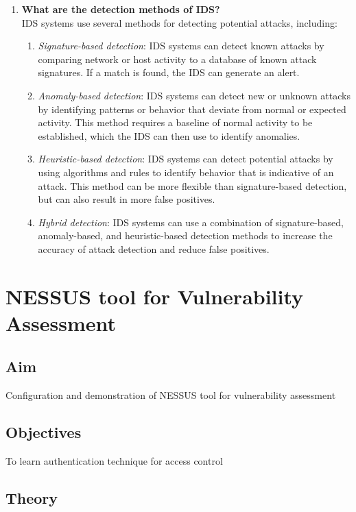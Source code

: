 \documentclass[openany]{book}
\begin{document}
\begin{enumerate}
    \item \textbf{What are the detection methods of IDS?}\\
          IDS systems use several methods for detecting potential attacks, including:
          \begin{enumerate}
              \item \textit{Signature-based detection}: IDS systems can detect known attacks by comparing network or host activity to a database of known attack signatures. If a match is found, the IDS can generate an alert.
              \item \textit{Anomaly-based detection}: IDS systems can detect new or unknown attacks by identifying patterns or behavior that deviate from normal or expected activity. This method requires a baseline of normal activity to be established, which the IDS can then use to identify anomalies.
              \item \textit{Heuristic-based detection}: IDS systems can detect potential attacks by using algorithms and rules to identify behavior that is indicative of an attack. This method can be more flexible than signature-based detection, but can also result in more false positives.
              \item \textit{Hybrid detection}: IDS systems can use a combination of signature-based, anomaly-based, and heuristic-based detection methods to increase the accuracy of attack detection and reduce false positives.
          \end{enumerate}


\end{enumerate}



\chapter{NESSUS tool for Vulnerability Assessment}
\section{Aim}
Configuration and demonstration of NESSUS tool for vulnerability assessment

\section{Objectives}
To learn authentication technique for access control

\section{Theory}
\end{document}
